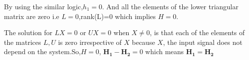 \documentclass[journal,12pt,twocolumn]{IEEEtran}
\numberwithin{equation}{subsection}
\let\vec\mathbf
\begin{document}
By using the similar logic,$h_1=0$. And all the elements of the lower triangular matrix are zero i.e $L=0$,rank(L)=0 which implies $H=0$.\par
The solution for $LX=0$ or $UX=0$ when $X\neq 0$, is that each of the elements of the matrices $L,U$ is zero irrespective of $X$ because $X$, the input signal does not depend on the system.So,$H=0$, $\vec{H_1}-\vec{H_2}=0$ which means $\vec{H_1}=\vec{H_2}$
\end{document}

